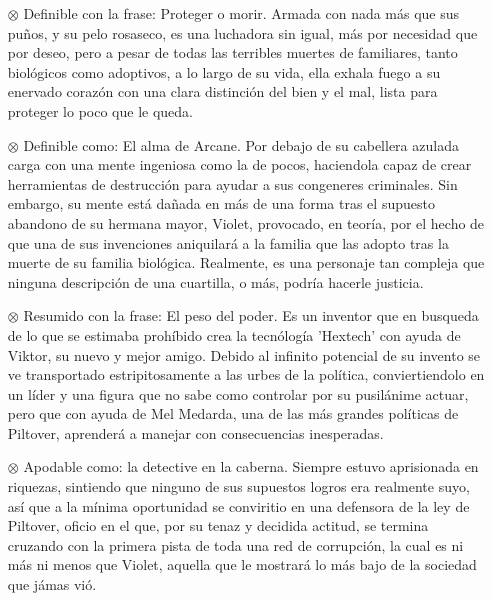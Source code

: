 \documentclass[11pt,a5paper]{article}
\begin{document}
\begin{itemize}
    \item[$\otimes$] {\textbf{}} Definible con la frase: Proteger o morir. Armada con nada más que sus puños, y su pelo rosaseco, es una luchadora sin igual, más por necesidad que por deseo, pero a pesar de todas las terribles muertes de familiares, tanto biológicos como adoptivos, a lo largo de su vida, ella exhala fuego a su enervado corazón con una clara distinción del bien y el mal, lista para proteger lo poco que le queda.
    \item[$\otimes$] {\textbf{}} Definible como: El alma de Arcane. Por debajo de su cabellera azulada carga con una mente ingeniosa como la de pocos, haciendola capaz de crear herramientas de destrucción para ayudar a sus congeneres criminales. Sin embargo, su mente está dañada en más de una forma tras el supuesto abandono de su hermana mayor, Violet, provocado, en teoría, por el hecho de que una de sus invenciones aniquilará a la familia que las adopto tras la muerte de su familia biológica. Realmente, es una personaje tan compleja que ninguna descripción de una cuartilla, o más, podría hacerle justicia.
    \item[$\otimes$] {\textbf{}} Resumido con la frase: El peso del poder. Es un inventor que en busqueda de lo que se estimaba prohíbido crea la tecnólogía 'Hextech' con ayuda de Viktor, su nuevo y mejor amigo. Debido al infinito potencial de su invento se ve transportado estripitosamente a las urbes de la política, conviertiendolo en un líder y una figura que no sabe como controlar por su pusilánime actuar, pero que con ayuda de Mel Medarda, una de las más grandes políticas de Piltover, aprenderá a manejar con consecuencias inesperadas.
    \item[$\otimes$] {\textbf{}} Apodable como: la detective en la caberna. Siempre estuvo aprisionada en riquezas, sintiendo que ninguno de sus supuestos logros era realmente suyo, así que a la mínima oportunidad se conviritio en una defensora de la ley de Piltover, oficio en el que, por su tenaz y decidida actitud, se termina cruzando con la primera pista de toda una red de corrupción, la cual es ni más ni menos que Violet, aquella que le mostrará lo más bajo de la sociedad que jámas vió.

\end{itemize}
\end{document}
